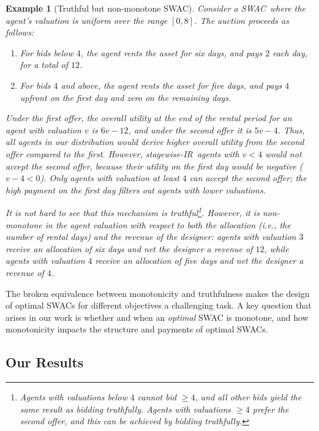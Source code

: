 \documentclass[11pt,letterpaper]{article}
\newcommand{\swir}{stagewise-IR\xspace}
\newcommand{\swac}{SWAC\xspace}
\newcommand{\swacs}{SWACs\xspace}
\theoremstyle{plain}
\newtheorem{example}[theorem]{Example}
\begin{document}
\begin{example}[Truthful but non-monotone \swac]
    \label{ex:intro-example}
    Consider a \swac\ 
    where the agent's valuation is uniform over the range $[0,8]$.
    The auction proceeds as follows:
    \begin{enumerate}
        \item For bids below $4$, the agent rents the asset for six days, and pays $2$
        each day, for a total of $12$.
         \item For bids $4$ and above, the agent rents the asset for five days, and pays $4$ upfront on the first day and zero on the remaining days.
    \end{enumerate}
    Under the first offer, the overall utility at the end of the rental period for an agent with valuation $v$ is $6v - 12$,
    and under the second offer it is $5v - 4$.
    Thus, all agents in our distribution would derive higher overall utility from the second offer  compared to the first. However, \swir\ agents with $v<4$ would not accept the second offer,
    because their utility on the first day would be negative
    ($v - 4 < 0$).
    Only agents with valuation at least $4$ can accept the second offer; the high payment on the first day \emph{filters out} agents with lower valuations.
    
    It is not hard to see that this mechanism is
    \emph{truthful}\footnote{
    Agents with valuations below $4$ cannot bid $\geq 4$, and all other bids yield the same result as bidding truthfully. Agents with valuations $\geq 4$ prefer the second offer, and this can be achieved by bidding truthfully.
    }.
    However, it is
    \emph{non-monotone in the agent valuation}
    with respect to both the allocation (i.e., the number of rental days)
    and the revenue of the designer:
    agents with valuation $3$ receive an allocation of six days and net the designer a revenue of $12$,
    while agents with valuation $4$ receive an allocation of five days and net the designer a revenue of $4$. 
\end{example}

The broken equivalence between monotonicity and truthfulness makes the design of optimal \swacs for different objectives a challenging task.
A key question that arises in our work is whether and when an \emph{optimal} \swac is monotone, and how monotonicity impacts the structure and payments of optimal \swacs.

\subsection{Our Results}
\label{sec:results}
\end{document}
